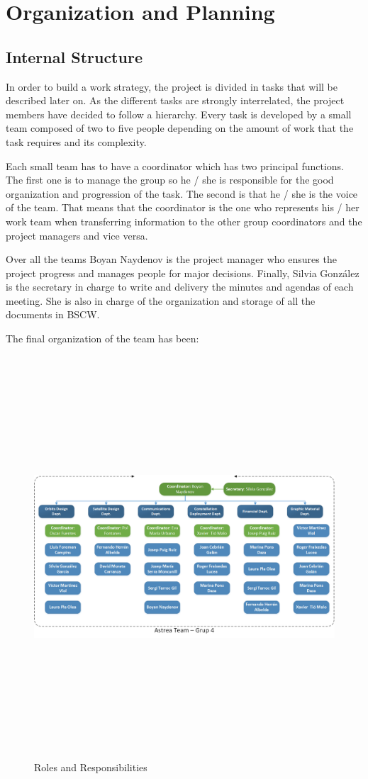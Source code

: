 \chapter{Organization and Planning}

\section{Internal Structure}
In order to build a work strategy, the project is divided in tasks that will be described later on. As the different tasks are strongly interrelated, the project members have decided to follow a hierarchy. Every task is developed by a small team composed of two to five people depending on the amount of work that the task requires and its complexity.

Each small team has to have a coordinator which has two principal functions. The first one is to manage the group so he / she is responsible for the good organization and progression of the task. The second is that he / she is the voice of the team. That means that the coordinator is the one who represents his / her work team when transferring information to the other group coordinators and the project managers and vice versa.

Over all the teams Boyan Naydenov is the project manager who ensures the project progress and manages people for major decisions. Finally, Silvia Gonz\'{a}lez is the secretary in charge to write and delivery the minutes and agendas of each meeting. She is also in charge of the organization and storage of all the documents in BSCW.

The final organization of the team has been:
 
\begin{figure}[H]
\centering
\includegraphics[width=15cm,height=15cm,keepaspectratio]{organigram-team.png}
\caption{Roles and Responsibilities}
\end{figure}

